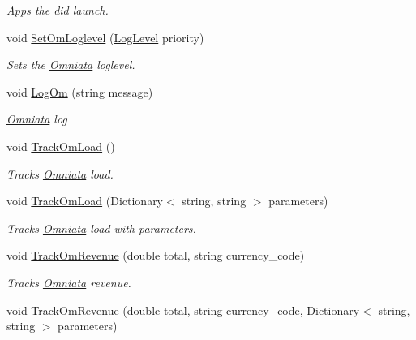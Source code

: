 \begin{DoxyCompactItemize}
\begin{DoxyCompactList}\small\item\em Apps the did launch. \end{DoxyCompactList}\item 
void \hyperlink{class_omniata_s_d_k_1_1_omniata_a94fe07ba323ce0fed14b91852c7f7848}{Set\+Om\+Loglevel} (\hyperlink{class_omniata_s_d_k_1_1_omniata_aac4ddf8e7386e787ff7ff8bab48cc6de}{Log\+Level} priority)
\begin{DoxyCompactList}\small\item\em Sets the \hyperlink{class_omniata_s_d_k_1_1_omniata}{Omniata} loglevel. \end{DoxyCompactList}\item 
void \hyperlink{class_omniata_s_d_k_1_1_omniata_ab085c7c3be514851414ebe5c009f59b4}{Log\+Om} (string message)
\begin{DoxyCompactList}\small\item\em \hyperlink{class_omniata_s_d_k_1_1_omniata}{Omniata} log \end{DoxyCompactList}\item 
void \hyperlink{class_omniata_s_d_k_1_1_omniata_afebdbc87ee705a0c1e67d7a742f52f68}{Track\+Om\+Load} ()
\begin{DoxyCompactList}\small\item\em Tracks \hyperlink{class_omniata_s_d_k_1_1_omniata}{Omniata} load. \end{DoxyCompactList}\item 
void \hyperlink{class_omniata_s_d_k_1_1_omniata_a3de8b8c2d2de2000c0df1309eeac912d}{Track\+Om\+Load} (Dictionary$<$ string, string $>$ parameters)
\begin{DoxyCompactList}\small\item\em Tracks \hyperlink{class_omniata_s_d_k_1_1_omniata}{Omniata} load with parameters. \end{DoxyCompactList}\item 
void \hyperlink{class_omniata_s_d_k_1_1_omniata_a7d73aa81f2d5ba389b3af2d3cfbe6bab}{Track\+Om\+Revenue} (double total, string currency\+\_\+code)
\begin{DoxyCompactList}\small\item\em Tracks \hyperlink{class_omniata_s_d_k_1_1_omniata}{Omniata} revenue. \end{DoxyCompactList}\item 
void \hyperlink{class_omniata_s_d_k_1_1_omniata_ac187a0ef974b99a79ad7fd96792d9e14}{Track\+Om\+Revenue} (double total, string currency\+\_\+code, Dictionary$<$ string, string $>$ parameters)

\end{DoxyCompactItemize}
